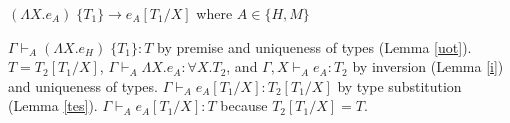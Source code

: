 \begin{case}
$(\Lambda X.e_{A})\;\lbrace T_{1}\rbrace\rightarrow e_{A}[T_{1}/X]$ where $A\in\lbrace H,M\rbrace$

$\Gamma\vdash_{A}(\Lambda X.e_{H})\;\lbrace T_{1}\rbrace:T$ by premise and uniqueness of types (Lemma \ref{uot}).  $T=T_{2}[T_{1}/X]$, $\Gamma\vdash_{A}\Lambda X.e_{A}:\forall X.T_{2}$, and $\Gamma,X\vdash_{A}e_{A}:T_{2}$ by inversion (Lemma \ref{i}) and uniqueness of types.  $\Gamma\vdash_{A}e_{A}[T_{1}/X]:T_{2}[T_{1}/X]$ by type substitution (Lemma \ref{tes}).  $\Gamma\vdash_{A}e_{A}[T_{1}/X]:T$ because $T_{2}[T_{1}/X]=T$.
\end{case}